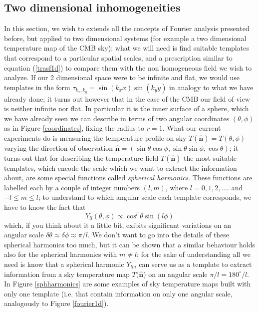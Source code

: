 \documentclass[11pt, a4paper,oneside,openright]{book}
\numberwithin{equation}{section}
\begin{document}
\subsection{Two dimensional inhomogeneities}
\label{2dsection}
In this section, we wish to extends all the concepts of Fourier analysis presented before, but applied to two dimensional systems (for example a two dimensional temperature map of the CMB sky); what we will need is find suitable templates that correspond to a particular spatial scales, and a prescription similar to equation (\ref{trasf1d}) to compare them with the non homogeneous field we wish to analyze. If our 2 dimensional space were to be infinite and flat, we would use templates in the form $\tau_{k_x,k_y}=\sin{ (k_x x)}\sin{(k_y y)}$ in analogy to what we have already done; it turns out however that in the case of the CMB our field of view is neither infinite nor flat. In particular it is the inner surface of a sphere, which we have already seen we can describe in terms of two angular coordinates $(\theta,\phi)$ as in Figure \ref{coordinates}, fixing the radius to $r=1$. What our current experiments do is measuring the temperature profile on sky $T(\mathbf{\hat{n}})=T(\theta,\phi)$ varying the 
direction of observation $\mathbf{\hat{n}}=(\sin \theta \cos \phi,\sin \theta \sin \phi,\cos \theta)$; it turns out that for describing the temperature field $T(\mathbf{\hat{n}})$ the most suitable templates, which encode the scale which we want to extract the information about, are some special functions called \textit{spherical harmonics}. These functions are labelled each by a couple of integer numbers $(l,m)$, where $l=0,1,2,....$ and $-l\leq m \leq l$; to understand to which angular scale each template corresponds, we have to know the fact that
\begin{equation}
Y_{ll}(\theta,\phi)\propto \cos^l\theta \sin{(l\phi)}
\end{equation}
which, if you think about it a little bit, exibits significant variations on an angular scale $\delta \theta \approx \delta\phi \approx \pi/l$. We don't want to go into the details of these spherical harmonics too much, but it can be shown that a similar behaviour holds also for the spherical harmonics with $m\neq l$; for the sake of understanding all we need is know that a spherical harmonic $Y_{lm}$ can serve us as a template to extract information from a sky temperature map $T(\mathbf{\hat{n}}$) on an angular scale $\pi/l=180^\circ/l$. In Figure \ref{sphharmonics} are some examples of sky temperature maps built with only one template (i.e. that contain information on only one angular scale, analogously to Figure \ref{fourier1d}). 
\end{document}
